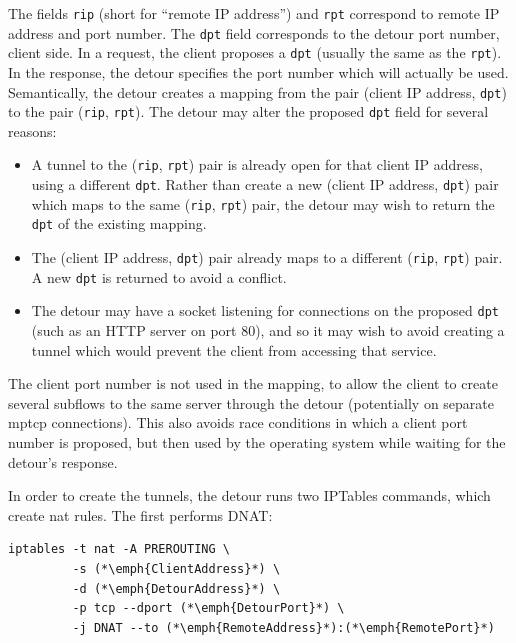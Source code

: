 \documentclass{cwru}
\begin{document}
The fields \texttt{rip} (short for ``remote IP address'') and \texttt{rpt}
correspond to remote IP address and port number. The \texttt{dpt} field
corresponds to the detour port number, client side. In a request, the client
proposes a \texttt{dpt} (usually the same as the \texttt{rpt}). In the response,
the detour specifies the port number which will actually be used. Semantically,
the detour creates a mapping from the pair (client IP address, \texttt{dpt}) to
the pair (\texttt{rip}, \texttt{rpt}). The detour may alter the proposed
\texttt{dpt} field for several reasons:

\begin{itemize}
\item A tunnel to the (\texttt{rip}, \texttt{rpt}) pair is already open for that
  client IP address, using a different \texttt{dpt}. Rather than create a new
  (client IP address, \texttt{dpt}) pair which maps to the same (\texttt{rip},
  \texttt{rpt}) pair, the detour may wish to return the \texttt{dpt} of the
  existing mapping.
\item The (client IP address, \texttt{dpt}) pair already maps to a different
  (\texttt{rip}, \texttt{rpt}) pair. A new \texttt{dpt} is returned to avoid a
  conflict.
\item The detour may have a socket listening for connections on the proposed
  \texttt{dpt} (such as an HTTP server on port 80), and so it may wish to avoid
  creating a tunnel which would prevent the client from accessing that service.
\end{itemize}

The client port number is not used in the mapping, to allow the client to create
several subflows to the same server through the detour (potentially on separate
\ac{mptcp} connections). This also avoids race conditions in which a client port
number is proposed, but then used by the operating system while waiting for the
detour's response.

In order to create the tunnels, the detour runs two IPTables commands, which
create \ac{nat} rules. The first performs DNAT:

\begin{minipage}{\linewidth} %
\begin{lstlisting}
iptables -t nat -A PREROUTING \
         -s (*\emph{ClientAddress}*) \
         -d (*\emph{DetourAddress}*) \
         -p tcp --dport (*\emph{DetourPort}*) \
         -j DNAT --to (*\emph{RemoteAddress}*):(*\emph{RemotePort}*)
\end{lstlisting}
\end{minipage}
\end{document}
